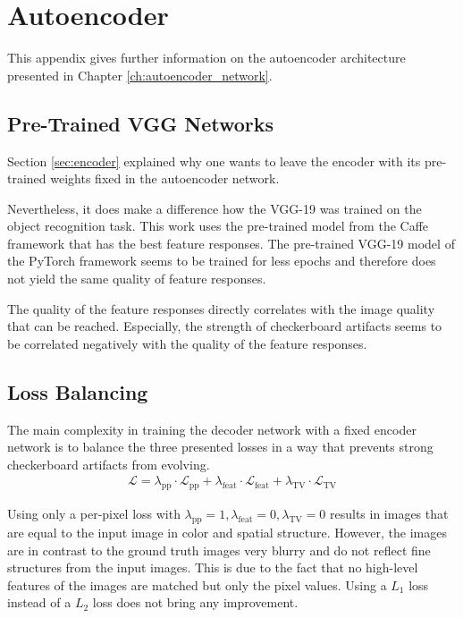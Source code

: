 \chapter{Autoencoder}
\label{appendix:A}
This appendix gives further information on the autoencoder architecture presented in Chapter \ref{ch:autoencoder_network}.

\section{Pre-Trained VGG Networks}
\label{A:sec:pretrained_autoencoders_from_different_frameworks}
Section \ref{sec:encoder} explained why one wants to leave the encoder with its pre-trained weights fixed in the autoencoder network. 

Nevertheless, it does make a difference how the VGG-19 was trained on the object recognition task. This work uses the pre-trained model from the Caffe framework \cite{caffe} that has the best feature responses. The pre-trained VGG-19 model of the PyTorch framework \cite{PyTorch} seems to be trained for less epochs and therefore does not yield the same quality of feature responses.

The quality of the feature responses directly correlates with the image quality that can be reached. Especially, the strength of checkerboard artifacts seems to be correlated negatively with the quality of the feature responses.

\section{Loss Balancing}
\label{A:sec:balancing_of_feature_loss_and_per_pixel_loss}
The main complexity in training the decoder network with a fixed encoder network is to balance the three presented losses in a way that prevents strong checkerboard artifacts from evolving. 
\begin{align}
\mathcal{L}
= 
\lambda_{\mathrm{pp}}
\cdot
\mathcal{L}_{\mathrm{pp}} +
\lambda_{\mathrm{feat}}
\cdot
\mathcal{L}_{\mathrm{feat}} +
\lambda_{\mathrm{TV}}
\cdot
\mathcal{L}_{\mathrm{TV}}
\end{align}

Using only a per-pixel loss with $\lambda_{\mathrm{pp}} = 1, \lambda_{\mathrm{feat}}=0, \lambda_{\mathrm{TV}}=0$ results in images that are equal to the input image in color and spatial structure. However, the images are in contrast to the ground truth images very blurry and do not reflect fine structures from the input images. This is due to the fact that no high-level features of the images are matched but only the pixel values. Using a $L_1$ loss instead of a $L_2$ loss does not bring any improvement. 

